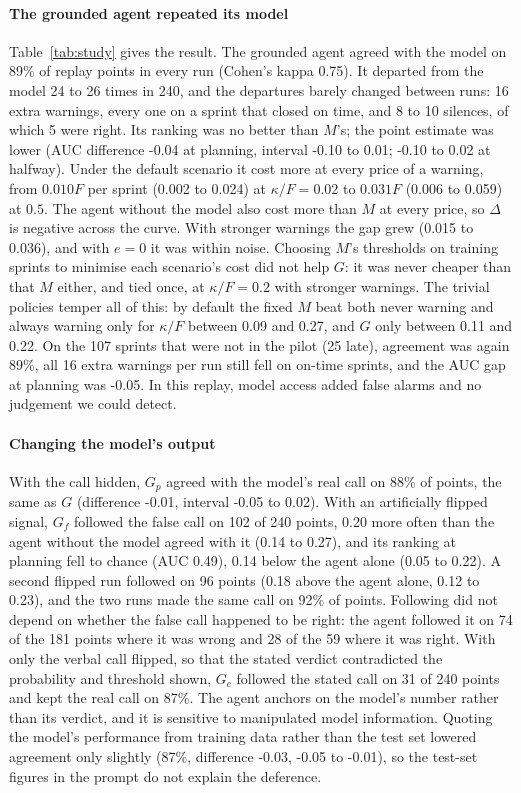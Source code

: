 \documentclass[conference]{IEEEtran}
\begin{document}
\paragraph{The grounded agent repeated its model} Table~\ref{tab:study} gives the result. The grounded agent agreed with the model on 89\% of replay points in every run (Cohen's kappa 0.75). It departed from the model 24 to 26 times in 240, and the departures barely changed between runs: 16 extra warnings, every one on a sprint that closed on time, and 8 to 10 silences, of which 5 were right. Its ranking was no better than $M$'s; the point estimate was lower (AUC difference -0.04 at planning, interval -0.10 to 0.01; -0.10 to 0.02 at halfway). Under the default scenario it cost more at every price of a warning, from $0.010F$ per sprint (0.002 to 0.024) at $\kappa/F=0.02$ to $0.031F$ (0.006 to 0.059) at $0.5$. The agent without the model also cost more than $M$ at every price, so $\Delta$ is negative across the curve. With stronger warnings the gap grew (0.015 to 0.036), and with $e=0$ it was within noise. Choosing $M$'s thresholds on training sprints to minimise each scenario's cost did not help $G$: it was never cheaper than that $M$ either, and tied once, at $\kappa/F=0.2$ with stronger warnings. The trivial policies temper all of this: by default the fixed $M$ beat both never warning and always warning only for $\kappa/F$ between 0.09 and 0.27, and $G$ only between 0.11 and 0.22. On the 107 sprints that were not in the pilot (25 late), agreement was again 89\%, all 16 extra warnings per run still fell on on-time sprints, and the AUC gap at planning was -0.05. In this replay, model access added false alarms and no judgement we could detect.

\paragraph{Changing the model's output} With the call hidden, $G_p$ agreed with the model's real call on 88\% of points, the same as $G$ (difference -0.01, interval -0.05 to 0.02). With an artificially flipped signal, $G_f$ followed the false call on 102 of 240 points, 0.20 more often than the agent without the model agreed with it (0.14 to 0.27), and its ranking at planning fell to chance (AUC 0.49), 0.14 below the agent alone (0.05 to 0.22). A second flipped run followed on 96 points (0.18 above the agent alone, 0.12 to 0.23), and the two runs made the same call on 92\% of points. Following did not depend on whether the false call happened to be right: the agent followed it on 74 of the 181 points where it was wrong and 28 of the 59 where it was right. With only the verbal call flipped, so that the stated verdict contradicted the probability and threshold shown, $G_c$ followed the stated call on 31 of 240 points and kept the real call on 87\%. The agent anchors on the model's number rather than its verdict, and it is sensitive to manipulated model information. Quoting the model's performance from training data rather than the test set lowered agreement only slightly (87\%, difference -0.03, -0.05 to -0.01), so the test-set figures in the prompt do not explain the deference.
\end{document}
